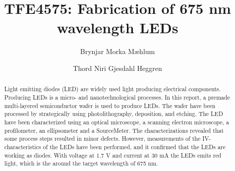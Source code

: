 \documentclass[5p,sort&compress]{elsarticle}
\begin{document}
\begin{frontmatter}

  \title{TFE4575: Fabrication of 675 nm wavelength LEDs}

  \author[fysikk]{Brynjar Morka Mæhlum}
  \author[fysikk]{Thord Niri Gjesdahl Heggren}
  \address[fysikk]{Department of Physics, Norwegian University of Science and Technology, 7491 Trondheim, Norway.}

  \begin{abstract}

    \noindent Light emitting diodes (LED) are widely used light producing electrical components.
    Producing LEDs is a micro- and nanotechnological processes.
    In this report, a premade multi-layered semiconductor wafer is used to produce LEDs.
    The wafer have been processed by strategically using photolithography, deposition, and etching.
    The LED have been characterized using an optical microscope, a scanning electron microscope, a profilometer, an ellipsometer and a SourceMeter.
    The characterizations revealed that some process steps resulted in minor defects.
    However, measurements of the IV-characteristics of the LEDs have been performed, and it confirmed that the LEDs are working as diodes.
    With voltage at 1.7 V and current at 30 mA the LEDs emits red light, which is the around the target wavelength of 675 nm.

  \end{abstract}


\end{frontmatter}
\end{document}
